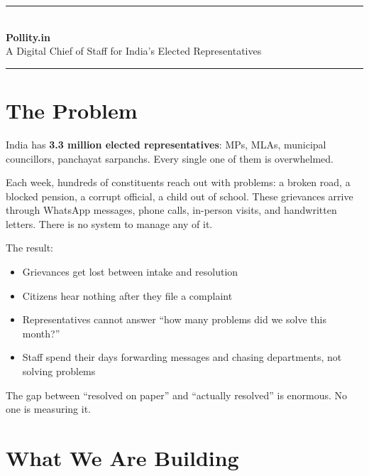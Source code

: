 \documentclass[11pt, a4paper]{article}
\begin{document}
\begin{center}
  {\color{pollityblue}\rule{\linewidth}{1.5pt}}\\[0.5em]
  {\Huge\bfseries\color{pollityblue} Pollity.in}\\[0.3em]
  {\large A Digital Chief of Staff for India's Elected Representatives}\\[0.3em]
  {\color{pollityblue}\rule{\linewidth}{1.5pt}}
\end{center}

\vspace{0.8em}

\section{The Problem}

India has \textbf{3.3 million elected representatives}: MPs, MLAs, municipal councillors, panchayat sarpanchs. Every single one of them is overwhelmed.

Each week, hundreds of constituents reach out with problems: a broken road, a blocked pension, a corrupt official, a child out of school. These grievances arrive through WhatsApp messages, phone calls, in-person visits, and handwritten letters. There is no system to manage any of it.

The result:

\begin{itemize}[leftmargin=1.5em, itemsep=3pt]
  \item Grievances get lost between intake and resolution
  \item Citizens hear nothing after they file a complaint
  \item Representatives cannot answer ``how many problems did we solve this month?''
  \item Staff spend their days forwarding messages and chasing departments, not solving problems
\end{itemize}

The gap between ``resolved on paper'' and ``actually resolved'' is enormous. No one is measuring it.

\section{What We Are Building}
\end{document}
